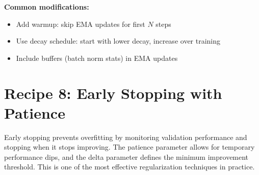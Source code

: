 \documentclass[../main.tex]{subfiles}
\begin{document}
\textbf{Common modifications:}
\begin{itemize}
    \item Add warmup: skip EMA updates for first $N$ steps
    \item Use decay schedule: start with lower decay, increase over training
    \item Include buffers (batch norm stats) in EMA updates
\end{itemize}

\section{Recipe 8: Early Stopping with Patience}\label{sec:recipe-early-stopping}

Early stopping prevents overfitting by monitoring validation performance and stopping when it stops improving. The patience parameter allows for temporary performance dips, and the delta parameter defines the minimum improvement threshold. This is one of the most effective regularization techniques in practice.
\end{document}
